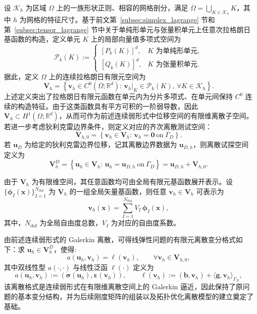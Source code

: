 设 $\mathcal{K}_h$ 为区域 $\Omega$ 上的一族形状正则、相容的网格剖分，满足 $\overline{\Omega}=\bigcup_{K\in\mathcal{K}_h}K$，其中 $h$ 为网格的特征尺寸。基于前文第~\ref{subsec:simplex_lagrange} 节和第~\ref{subsec:tensor_lagrange} 节中关于单纯形单元与张量积单元上任意次拉格朗日基函数的构造，定义单元 $K$ 上的局部向量值多项式空间为
\[
\boldsymbol{\mathcal P}_k(K) := 
\begin{cases} 
	[P_k(K)]^d, & K \text{ 为单纯形单元},\\[4pt] [Q_k(K)]^d, & K \text{ 为张量积单元}. 
\end{cases}
\]
据此，定义 $\Omega$ 上的连续拉格朗日有限元空间为
\[
\boldsymbol{V}_h = \left\{ \boldsymbol{v}_h\in C^0(\overline{\Omega};\mathbb{R}^d):\, \boldsymbol{v}_h|_K\in \boldsymbol{\mathcal P}_k(K),\,\forall K\in\mathcal{K}_h \right\}.
\]
上述定义突出了拉格朗日有限元函数在单元内为分片多项式、在单元间保持 $C^0$ 连续的构造特征。由于这类函数具有平方可积的一阶弱导数，因此 $\boldsymbol{V}_h\subset H^1(\Omega;\mathbb{R}^d)$，从而可作为前述连续弱形式中位移空间的有限维离散子空间。若进一步考虑狄利克雷边界条件，则定义对应的齐次离散测试空间：
\[
\boldsymbol{V}_{h,0} = \left\{ \boldsymbol{v}_h\in\boldsymbol{V}_h:\, \boldsymbol{v}_h=\boldsymbol{0}\ \text{on}\ \Gamma_D \right\}.
\]
若 $\boldsymbol{u}_D$ 为给定的狄利克雷边界位移，记其离散边界数据为 $\boldsymbol{u}_{D,h}$，则离散试探空间定义为
\[
\boldsymbol{V}_h^D = \left\{ \boldsymbol{u}_h\in\boldsymbol{V}_h:\, \boldsymbol{u}_h=\boldsymbol{u}_{D,h}\ \text{on}\ \Gamma_D \right\} = \boldsymbol{u}_{D,h}+\boldsymbol{V}_{h,0}.
\]

由于 $\boldsymbol{V}_h$ 为有限维空间，其任意函数均可由全局有限元基函数展开表示。设 $\{\boldsymbol{\phi}_I(\boldsymbol{x})\}_{I=1}^{N_{\text{dof}}}$ 为 $\boldsymbol{V}_h$ 的一组全局矢量基函数，则任意 $\boldsymbol{v}_h\in\boldsymbol{V}_h$ 可表示为
\[
\boldsymbol{v}_h(\boldsymbol{x}) = \sum_{I=1}^{N_{\mathrm{dof}}} V_I\,\boldsymbol{\phi}_I(\boldsymbol{x}),
\]
其中，$N_{\mathrm{dof}}$ 为全局自由度总数，$V_I$ 为对应的自由度系数。

由前述连续弱形式的 Galerkin 离散，可得线弹性问题的有限元离散变分格式如下：求 $\boldsymbol{u}_h\in\boldsymbol{V}_h^D$，使得:
\begin{equation} \label{eq:ch3_discrete_weak_form}
	a(\boldsymbol{u}_h,\boldsymbol{v}_h)=\ell(\boldsymbol{v}_h), \qquad \forall \boldsymbol{v}_h\in\boldsymbol{V}_{h,0},
\end{equation}
其中双线性型 $a(\cdot,\cdot)$ 与线性泛函 $\ell(\cdot)$ 定义为
\[
a(\boldsymbol{u}_h,\boldsymbol{v}_h) := (\boldsymbol{\sigma}(\boldsymbol{u}_h),\boldsymbol{\varepsilon}(\boldsymbol{v}_h)), \qquad \ell(\boldsymbol{v}_h) := (\boldsymbol{b},\boldsymbol{v}_h) + \langle\boldsymbol{g},\boldsymbol{v}_h\rangle_{\Gamma_N},
\]
该离散格式是连续弱形式在有限维离散空间上的 Galerkin 逼近，因此保持了原问题的基本变分结构，并为后续刚度矩阵的组装以及拓扑优化离散模型的建立奠定了基础。

